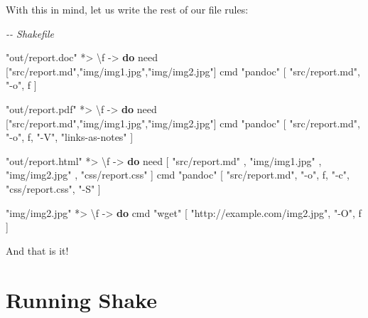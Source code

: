 \documentclass[]{article}
\newenvironment{Shaded}{}{}
\newcommand{\CommentTok}[1]{\textcolor[rgb]{0.38,0.63,0.69}{\textit{#1}}}
\newcommand{\KeywordTok}[1]{\textcolor[rgb]{0.00,0.44,0.13}{\textbf{#1}}}
\newcommand{\NormalTok}[1]{#1}
\newcommand{\OperatorTok}[1]{\textcolor[rgb]{0.40,0.40,0.40}{#1}}
\newcommand{\OtherTok}[1]{\textcolor[rgb]{0.00,0.44,0.13}{#1}}
\newcommand{\StringTok}[1]{\textcolor[rgb]{0.25,0.44,0.63}{#1}}
\begin{document}
With this in mind, let us write the rest of our file rules:

\begin{Shaded}
\begin{Highlighting}[]
\CommentTok{{-}{-} Shakefile}

\StringTok{"out/report.doc"} \OperatorTok{*\textgreater{}}\NormalTok{ \textbackslash{}f }\OtherTok{{-}\textgreater{}} \KeywordTok{do}
\NormalTok{    need [}\StringTok{"src/report.md"}\NormalTok{,}\StringTok{"img/img1.jpg"}\NormalTok{,}\StringTok{"img/img2.jpg"}\NormalTok{]}
\NormalTok{    cmd }\StringTok{"pandoc"}\NormalTok{ [ }\StringTok{"src/report.md"}\NormalTok{, }\StringTok{"{-}o"}\NormalTok{, f ]}

\StringTok{"out/report.pdf"} \OperatorTok{*\textgreater{}}\NormalTok{ \textbackslash{}f }\OtherTok{{-}\textgreater{}} \KeywordTok{do}
\NormalTok{    need [}\StringTok{"src/report.md"}\NormalTok{,}\StringTok{"img/img1.jpg"}\NormalTok{,}\StringTok{"img/img2.jpg"}\NormalTok{]}
\NormalTok{    cmd }\StringTok{"pandoc"}\NormalTok{ [ }\StringTok{"src/report.md"}\NormalTok{, }\StringTok{"{-}o"}\NormalTok{, f, }\StringTok{"{-}V"}\NormalTok{, }\StringTok{"links{-}as{-}notes"}\NormalTok{ ]}

\StringTok{"out/report.html"} \OperatorTok{*\textgreater{}}\NormalTok{ \textbackslash{}f }\OtherTok{{-}\textgreater{}} \KeywordTok{do}
\NormalTok{    need [ }\StringTok{"src/report.md"}
\NormalTok{         , }\StringTok{"img/img1.jpg"}
\NormalTok{         , }\StringTok{"img/img2.jpg"}
\NormalTok{         , }\StringTok{"css/report.css"}\NormalTok{ ]}
\NormalTok{    cmd }\StringTok{"pandoc"}\NormalTok{ [ }\StringTok{"src/report.md"}\NormalTok{, }\StringTok{"{-}o"}\NormalTok{, f, }\StringTok{"{-}c"}\NormalTok{, }\StringTok{"css/report.css"}\NormalTok{, }\StringTok{"{-}S"}\NormalTok{ ]}

\StringTok{"img/img2.jpg"} \OperatorTok{*\textgreater{}}\NormalTok{ \textbackslash{}f }\OtherTok{{-}\textgreater{}} \KeywordTok{do}
\NormalTok{    cmd }\StringTok{"wget"}\NormalTok{ [ }\StringTok{"http://example.com/img2.jpg"}\NormalTok{, }\StringTok{"{-}O"}\NormalTok{, f ]}
\end{Highlighting}
\end{Shaded}

And that is it!

\section{Running Shake}\label{running-shake}
\end{document}
